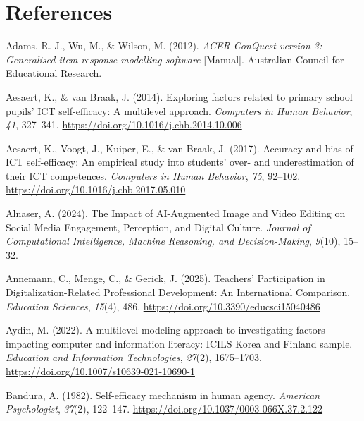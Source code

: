 \documentclass[
  letterpaper,
  DIV=11,
  numbers=noendperiod]{scrartcl}
\newlength{\cslhangindent}
\newenvironment{CSLReferences}[2] %
 {\begin{list}{}{%
  \setlength{\itemindent}{0pt}
  \setlength{\leftmargin}{0pt}
  \setlength{\parsep}{0pt}
  \ifodd #1
   \setlength{\leftmargin}{\cslhangindent}
   \setlength{\itemindent}{-1\cslhangindent}
  \fi
  \setlength{\itemsep}{#2\baselineskip}}}
 {\end{list}}
\begin{document}
\section{References}\label{references}

\label{refs}
\begin{CSLReferences}{1}{0}
Adams, R. J., Wu, M., \& Wilson, M. (2012). \emph{{ACER ConQuest}
version 3: {Generalised} item response modelling software} {[}Manual{]}.
Australian Council for Educational Research.

Aesaert, K., \& van Braak, J. (2014). Exploring factors related to
primary school pupils' {ICT} self-efficacy: {A} multilevel approach.
\emph{Computers in Human Behavior}, \emph{41}, 327--341.
\url{https://doi.org/10.1016/j.chb.2014.10.006}

Aesaert, K., Voogt, J., Kuiper, E., \& van Braak, J. (2017). Accuracy
and bias of {ICT} self-efficacy: {An} empirical study into students'
over- and underestimation of their {ICT} competences. \emph{Computers in
Human Behavior}, \emph{75}, 92--102.
\url{https://doi.org/10.1016/j.chb.2017.05.010}

Alnaser, A. (2024). The {Impact} of {AI-Augmented Image} and {Video
Editing} on {Social Media Engagement}, {Perception}, and {Digital
Culture}. \emph{Journal of Computational Intelligence, Machine
Reasoning, and Decision-Making}, \emph{9}(10), 15--32.

Annemann, C., Menge, C., \& Gerick, J. (2025). Teachers' {Participation}
in {Digitalization-Related Professional Development}: {An International
Comparison}. \emph{Education Sciences}, \emph{15}(4), 486.
\url{https://doi.org/10.3390/educsci15040486}

Aydin, M. (2022). A multilevel modeling approach to investigating
factors impacting computer and information literacy: {ICILS Korea} and
{Finland} sample. \emph{Education and Information Technologies},
\emph{27}(2), 1675--1703.
\url{https://doi.org/10.1007/s10639-021-10690-1}

Bandura, A. (1982). Self-efficacy mechanism in human agency.
\emph{American Psychologist}, \emph{37}(2), 122--147.
\url{https://doi.org/10.1037/0003-066X.37.2.122}


\end{CSLReferences}
\end{document}
